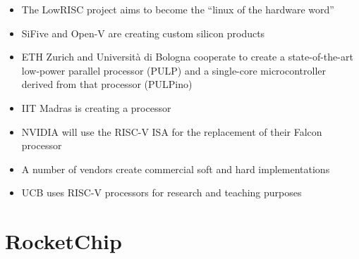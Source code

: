 \documentclass[journal,a4paper]{IEEEtran}
\begin{document}

\begin{itemize}
	\item The LowRISC project aims to become the ``linux of the hardware word''\cite{lowrisc}
	\item SiFive\cite{sifive} and Open-V are creating custom silicon products\cite{open-v}
	\item ETH Zurich and Università di Bologna cooperate to create a state-of-the-art low-power parallel processor (PULP) and a single-core microcontroller derived from that processor (PULPino)\cite{pulp}
	\item IIT Madras is creating a processor\cite{iid-madras}
	\item NVIDIA will use the RISC-V ISA for the replacement of their Falcon processor\cite{nvidia}
	\item A number of vendors create commercial soft and hard implementations\cite{riscv-commercial} %
	\item UCB uses RISC-V processors for research\cite{ucb-science} and teaching purposes\cite{sodor}
\end{itemize}

\section{RocketChip}
\end{document}
